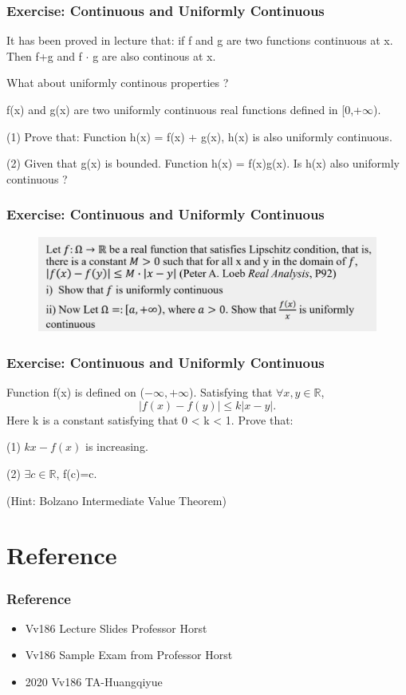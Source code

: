 \documentclass{beamer}
\begin{document}
\begin{frame}
    \frametitle{Exercise: Continuous and Uniformly Continuous}
    It has been proved in lecture that: if f and g are two functions continuous at x. Then f+g and f $\cdot$ g are also continous at x.

    \vspace{1em}
    What about uniformly continous properties ?

    f(x) and g(x) are two uniformly continuous real functions defined in [0,+$\infty$).

    (1) Prove that:
    Function h(x) = f(x) + g(x), h(x) is also uniformly continuous.

    (2) Given that g(x) is bounded. Function h(x) = f(x)g(x). Is h(x) also uniformly continuous ?


\end{frame}

\begin{frame}
    \frametitle{Exercise: Continuous and Uniformly Continuous}
    \begin{figure}[htbp]
        \centering
        \includegraphics[width=12cm]{exerciseContinuous.png}
    \end{figure}
\end{frame}


\begin{frame}
    \frametitle{Exercise: Continuous and Uniformly Continuous}
    Function f(x) is defined on ($-\infty,+\infty$). Satisfying that $\forall x,y \in \mathbb{R}$,
    \begin{equation*}
        \left|f(x)-f(y)\right|\leq k\left|x-y\right|.
    \end{equation*}
    Here k is a constant satisfying that 0 < k < 1. Prove that:

    (1) $kx-f(x)$ is increasing.

    (2) $\exists c\in \mathbb{R}$, f(c)=c.

    (Hint: Bolzano Intermediate Value Theorem)
\end{frame}

\section{Reference}
\begin{frame}
    \frametitle{Reference}
    \begin{itemize}
        \item Vv186 Lecture Slides Professor Horst
        \item Vv186 Sample Exam from Professor Horst
        \item 2020 Vv186 TA-Huangqiyue
    \end{itemize}
\end{frame}
\end{document}
